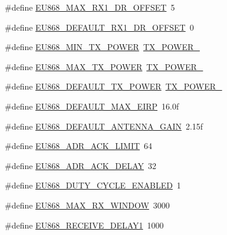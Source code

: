 \begin{DoxyCompactItemize}
\item 
\#define \hyperlink{group__REGIONEU868_ga90ce5649045707b0bbaaa0bbd039940b}{E\+U868\+\_\+\+M\+A\+X\+\_\+\+R\+X1\+\_\+\+D\+R\+\_\+\+O\+F\+F\+S\+ET}~5
\item 
\#define \hyperlink{group__REGIONEU868_gab3c86769eb58a2529ede7cd544bffc58}{E\+U868\+\_\+\+D\+E\+F\+A\+U\+L\+T\+\_\+\+R\+X1\+\_\+\+D\+R\+\_\+\+O\+F\+F\+S\+ET}~0
\item 
\#define \hyperlink{group__REGIONEU868_gab935a0225d447579203239740e33c72f}{E\+U868\+\_\+\+M\+I\+N\+\_\+\+T\+X\+\_\+\+P\+O\+W\+ER}~\hyperlink{group__REGION_ga3c7bd9a98f0c1e7e9aaa90857c4bd700}{T\+X\+\_\+\+P\+O\+W\+E\+R\+\_}
\item 
\#define \hyperlink{group__REGIONEU868_ga39e338c7f8454f594302811f61d9560d}{E\+U868\+\_\+\+M\+A\+X\+\_\+\+T\+X\+\_\+\+P\+O\+W\+ER}~\hyperlink{group__REGION_gab33618449f2a573142c463ab071ef8ed}{T\+X\+\_\+\+P\+O\+W\+E\+R\+\_}
\item 
\#define \hyperlink{group__REGIONEU868_ga2e0b523fc68d50dc0711a07d8926c8c6}{E\+U868\+\_\+\+D\+E\+F\+A\+U\+L\+T\+\_\+\+T\+X\+\_\+\+P\+O\+W\+ER}~\hyperlink{group__REGION_gab33618449f2a573142c463ab071ef8ed}{T\+X\+\_\+\+P\+O\+W\+E\+R\+\_}
\item 
\#define \hyperlink{group__REGIONEU868_ga1637006dd28e0ae483e1260c2152ece2}{E\+U868\+\_\+\+D\+E\+F\+A\+U\+L\+T\+\_\+\+M\+A\+X\+\_\+\+E\+I\+RP}~16.\+0f
\item 
\#define \hyperlink{group__REGIONEU868_ga943854d7099f892dd9dc86a6accbd813}{E\+U868\+\_\+\+D\+E\+F\+A\+U\+L\+T\+\_\+\+A\+N\+T\+E\+N\+N\+A\+\_\+\+G\+A\+IN}~2.\+15f
\item 
\#define \hyperlink{group__REGIONEU868_ga67c54d4a8b30d30138dd013779f72cdf}{E\+U868\+\_\+\+A\+D\+R\+\_\+\+A\+C\+K\+\_\+\+L\+I\+M\+IT}~64
\item 
\#define \hyperlink{group__REGIONEU868_ga13b5d7d3346971d4dda9919ed73b1394}{E\+U868\+\_\+\+A\+D\+R\+\_\+\+A\+C\+K\+\_\+\+D\+E\+L\+AY}~32
\item 
\#define \hyperlink{group__REGIONEU868_gaa8c53df1d013b427281bafe2ed9cbcce}{E\+U868\+\_\+\+D\+U\+T\+Y\+\_\+\+C\+Y\+C\+L\+E\+\_\+\+E\+N\+A\+B\+L\+ED}~1
\item 
\#define \hyperlink{group__REGIONEU868_ga7d51abf9369b7478a74590db5c5c2bb1}{E\+U868\+\_\+\+M\+A\+X\+\_\+\+R\+X\+\_\+\+W\+I\+N\+D\+OW}~3000
\item 
\#define \hyperlink{group__REGIONEU868_ga5e54e03af0ee7ada0b1fd781009a24da}{E\+U868\+\_\+\+R\+E\+C\+E\+I\+V\+E\+\_\+\+D\+E\+L\+A\+Y1}~1000
\item 

\end{DoxyCompactItemize}
